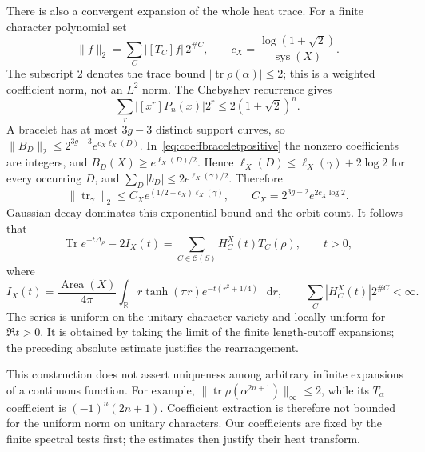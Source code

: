 \documentclass[11pt,a4paper]{article}
\numberwithin{equation}{section}
\theoremstyle{definition}
\theoremstyle{remark}
\DeclareMathOperator{\tr}{tr}
\newcommand{\dd}{\mathop{}\!\mathrm d}
\newcommand{\RR}{\mathbb R}
\begin{document}
There is also a convergent expansion of the whole heat trace.
For a finite character polynomial set
\[
 \|f\|_2=\sum_C|[T_C]f|\,2^{\#C},\qquad
 c_X=\frac{\log(1+\sqrt2)}{\operatorname{sys}(X)}.
\]
The subscript $2$ denotes the trace bound $|\tr\rho(\alpha)|\leq2$;
this is a weighted coefficient norm, not an $L^2$ norm.
The Chebyshev recurrence gives
\[
 \sum_r|[x^r]P_n(x)|2^r\leq2(1+\sqrt2)^n.
\]
A bracelet has at most $3g-3$ distinct support curves, so
$\|B_D\|_2\leq2^{3g-3}e^{c_X\ell_X(D)}$.
In~\eqref{eq:coeffbraceletpositive} the nonzero coefficients are
integers, and $B_D(X)\geq e^{\ell_X(D)/2}$. Hence
$\ell_X(D)\leq\ell_X(\gamma)+2\log2$ for every occurring $D$,
and $\sum_D|b_D|\leq2e^{\ell_X(\gamma)/2}$. Therefore
\begin{equation}
 \|\tr_\gamma\|_2\leq
 C_X e^{(1/2+c_X)\ell_X(\gamma)},\qquad
 C_X=2^{3g-2}e^{2c_X\log2}.
 \label{eq:coeffallchannelbound}
\end{equation}
Gaussian decay dominates this exponential bound and the orbit count.
It follows that
\begin{equation}
 \boxed{
 \operatorname{Tr}e^{-t\Delta_\rho}-2I_X(t)
 =\sum_{C\in\mathscr C(S)}H_C^X(t)T_C(\rho),\qquad t>0,
 }
 \label{eq:coefffullheatexpansion}
\end{equation}
where
\[
 I_X(t)=\frac{\operatorname{Area}(X)}{4\pi}
  \int_\RR r\tanh(\pi r)e^{-t(r^2+1/4)}\,\dd r,
 \qquad \sum_C|H_C^X(t)|2^{\#C}<\infty.
\]
The series is uniform on the unitary character variety and locally
uniform for $\Re t>0$. It is obtained by taking the limit of the
finite length-cutoff expansions; the preceding absolute estimate
justifies the rearrangement.

This construction does not assert uniqueness among arbitrary
infinite expansions of a continuous function. For example,
$\|\tr\rho(\alpha^{2n+1})\|_\infty\leq2$, while its
$T_\alpha$ coefficient is $(-1)^n(2n+1)$. Coefficient extraction
is therefore not bounded for the uniform norm on unitary characters.
Our coefficients are fixed by the finite spectral tests first;
the estimates then justify their heat transform.
\end{document}
